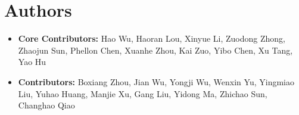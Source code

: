 \documentclass{firered}
\begin{document}
\setcounter{footnote}{0}  %
\renewcommand{\thefootnote}{\arabic{footnote}}  %



\clearpage
\renewcommand{\contentsname}{\textcolor{sectionred}{Contents}}
\tableofcontents
\clearpage
















\section{Authors}
\begin{itemize}
   \item \textbf{Core Contributors:} Hao Wu, Haoran Lou, Xinyue Li, Zuodong Zhong, Zhaojun Sun, Phellon Chen, Xuanhe Zhou, Kai Zuo, Yibo Chen, Xu Tang, Yao Hu
    \item \textbf{Contributors:} Boxiang Zhou, Jian Wu, Yongji Wu, Wenxin Yu, Yingmiao Liu, Yuhao Huang, Manjie Xu, Gang Liu, Yidong Ma, Zhichao Sun, Changhao Qiao
\end{itemize}



\clearpage




% 
\end{document}
